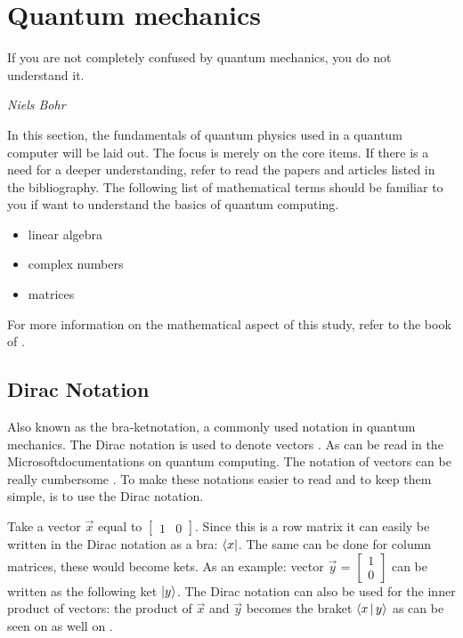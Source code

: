 \section{Quantum mechanics} \label{quantum mechanics}
\epigraph{If you are not completely confused by quantum mechanics, you do not understand it.}{\textit{Niels Bohr}}

In this section, the fundamentals of quantum physics used in a quantum computer will be laid out.
The focus is merely on the core items. If there is a need for a deeper understanding, refer to read the papers and articles listed in the bibliography.
The following list of mathematical terms should be familiar to you if want to understand the basics of quantum computing.

\begin{itemize}
    \item linear algebra
    \item complex numbers
    \item matrices
\end{itemize}

For more information on the mathematical aspect of this study, refer to the book of \textcite{bernhardt_2019}.

\subsection{Dirac Notation} \label{Dirac}
Also known as the bra-ketnotation, a commonly used notation in quantum mechanics. The Dirac notation is used to denote vectors \autocite{Dirac_Notation2020}.
As can be read in the Microsoft\textregistered documentations on quantum computing. The notation of vectors can be really cumbersome \autocite{Microsoft_Dirac}. To make these notations easier to read and to keep them simple, is to use the Dirac notation.

Take a vector $\vec{x}$ equal to $\begin{bmatrix}
    1 & 0 
\end{bmatrix}$.
Since this is a row matrix it can easily be written in the Dirac notation as a bra: $\bra{x}$. The same can be done for column matrices, these would become kets. As an example:
vector $\vec{y}$ = $\begin{bmatrix}
    1 \\
    0
\end{bmatrix}$ can be written as the following ket $\ket{y}$.
The Dirac notation can also be used for the inner product of vectors: the product of $\vec{x}$ and $\vec{y}$ becomes the braket $\Braket{x|y}$ as can be seen on \textcite{Dirac_Notation2020} as well on \textcite{Microsoft_Dirac}.

